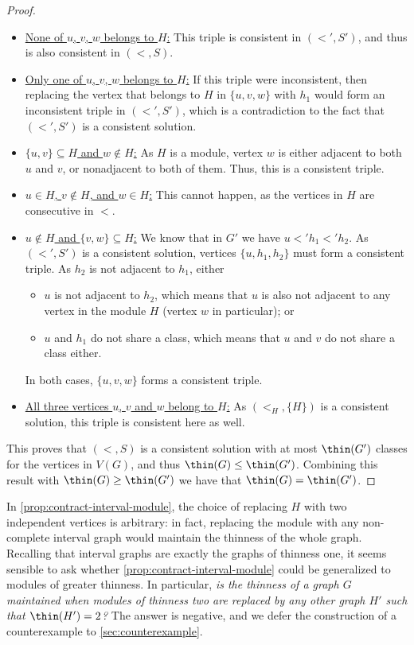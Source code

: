 \documentclass[11pt]{article}
\theoremstyle{plain}
\theoremstyle{definition}
\theoremstyle{remark}
\begin{document}
\begin{proof}
    \begin{itemize}
        \item \underline{None of $u$, $v$, $w$ belongs to $H$:} This triple is consistent in $(<', S')$, and thus is also consistent in $(<, S)$.
        \item \underline{Only one of $u$, $v$, $w$ belongs to $H$:} If this triple were inconsistent, then replacing the vertex that belongs to $H$ in $\{u, v, w\}$ with $h_1$ would form an inconsistent triple in $(<', S')$, which is a contradiction to the fact that $(<', S')$ is a consistent solution.
        \item \underline{$\{u, v\} \subseteq H$ and $w \not \in H$:} As $H$ is a module, vertex $w$ is either adjacent to both $u$ and $v$, or nonadjacent to both of them. Thus, this is a consistent triple.
        \item \underline{$u \in H$, $v \not \in H$, and $w \in H$:} This cannot happen, as the vertices in $H$ are consecutive in $<$.
        \item \underline{$u \not \in H$ and $\{v, w\} \subseteq H$:} We know that in $G'$ we have $u <' h_1 <' h_2$. As $(<', S')$ is a consistent solution, vertices $\{u, h_1, h_2\}$ must form a consistent triple. As $h_2$ is not adjacent to $h_1$, either
            \begin{itemize}
                \item $u$ is not adjacent to $h_2$, which means that $u$ is also not adjacent to any vertex in the module $H$ (vertex $w$ in particular); or
                \item $u$ and $h_1$ do not share a class, which means that $u$ and $v$ do not share a class either.
            \end{itemize}
        In both cases, $\{u, v, w\}$ forms a consistent triple.
        \item \underline{All three vertices $u$, $v$ and $w$ belong to $H$:} As $(<_H, \{H\})$ is a consistent solution, this triple is consistent here as well.
     \end{itemize}

    This proves that $(<, S)$ is a consistent solution with at most $\thin(G')$ classes for the vertices in $V(G)$, and thus $\thin(G) \leq \thin(G')$. Combining this result with $\thin(G) \geq \thin(G')$ we have that $\thin(G) = \thin(G')$.
\end{proof}

In \cref{prop:contract-interval-module}, the choice of replacing $H$ with two independent vertices is arbitrary: in fact, replacing the module with any non-complete interval graph would maintain the thinness of the whole graph. Recalling that interval graphs are exactly the graphs of thinness one, it seems sensible to ask whether \cref{prop:contract-interval-module} could be generalized to modules of greater thinness. In particular, \emph{is the thinness of a graph $G$ maintained when modules of thinness two are replaced by any other graph $H'$ such that $\thin(H') = 2$?} 
The answer is negative, and we defer the construction of a counterexample to \cref{sec:counterexample}.
\end{document}
